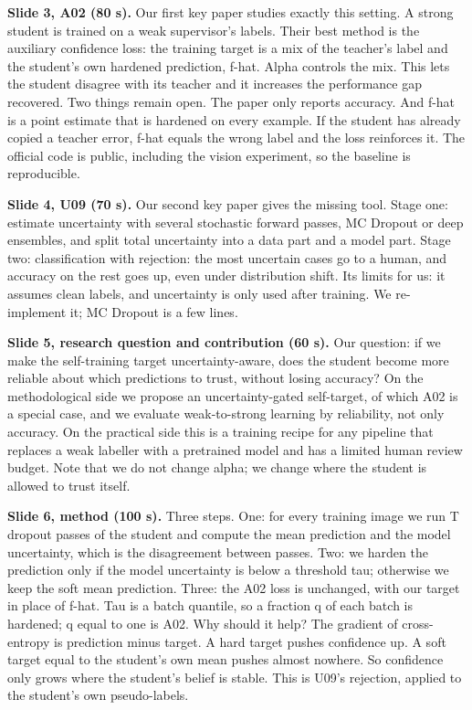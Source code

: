 \documentclass[10pt,a4paper]{article}
\begin{document}
\textbf{Slide 3, A02 (80 s).} Our first key paper studies exactly this setting. A strong student is trained on a
weak supervisor's labels. Their best method is the auxiliary confidence loss: the training target is a mix of
the teacher's label and the student's own hardened prediction, f-hat. Alpha controls the mix. This lets the
student disagree with its teacher and it increases the performance gap recovered. Two things remain open. The
paper only reports accuracy. And f-hat is a point estimate that is hardened on every example. If the student
has already copied a teacher error, f-hat equals the wrong label and the loss reinforces it. The official code
is public, including the vision experiment, so the baseline is reproducible.

\textbf{Slide 4, U09 (70 s).} Our second key paper gives the missing tool. Stage one: estimate uncertainty with
several stochastic forward passes, MC Dropout or deep ensembles, and split total uncertainty into a data part
and a model part. Stage two: classification with rejection: the most uncertain cases go to a human, and
accuracy on the rest goes up, even under distribution shift. Its limits for us: it assumes clean labels, and
uncertainty is only used after training. We re-implement it; MC Dropout is a few lines.

\textbf{Slide 5, research question and contribution (60 s).} Our question: if we make the self-training target
uncertainty-aware, does the student become more reliable about which predictions to trust, without losing
accuracy? On the methodological side we propose an uncertainty-gated self-target, of which A02 is a special
case, and we evaluate weak-to-strong learning by reliability, not only accuracy. On the practical side this is
a training recipe for any pipeline that replaces a weak labeller with a pretrained model and has a limited
human review budget. Note that we do not change alpha; we change where the student is allowed to trust itself.

\textbf{Slide 6, method (100 s).} Three steps. One: for every training image we run T dropout passes of the
student and compute the mean prediction and the model uncertainty, which is the disagreement between passes.
Two: we harden the prediction only if the model uncertainty is below a threshold tau; otherwise we keep the
soft mean prediction. Three: the A02 loss is unchanged, with our target in place of f-hat. Tau is a batch
quantile, so a fraction q of each batch is hardened; q equal to one is A02. Why should it help? The gradient
of cross-entropy is prediction minus target. A hard target pushes confidence up. A soft target equal to the
student's own mean pushes almost nowhere. So confidence only grows where the student's belief is stable. This
is U09's rejection, applied to the student's own pseudo-labels.
\end{document}
